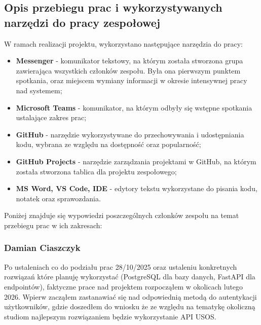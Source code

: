 \documentclass[12pt,a4paper]{article}
\begin{document}
\subsection{Opis przebiegu prac i wykorzystywanych narzędzi do pracy zespołowej}

W ramach realizacji projektu, wykorzystano następujące narzędzia do pracy:
\begin{itemize}
    \item \textbf{Messenger} - komunikator tekstowy, na którym została stworzona grupa zawierająca wszystkich członków zespołu. Była ona pierwszym punktem spotkania, oraz miejscem wymiany informacji w okresie intensywnej pracy nad systemem;
    \item \textbf{Microsoft Teams} - komunikator, na którym odbyły się wstępne spotkania ustalające zakres prac;
    \item \textbf{GitHub} - narzędzie wykorzystywane do przechowywania i udostępniania kodu, wybrana ze względu na dostępność oraz popularność;
    \item \textbf{GitHub Projects} - narzędzie zarządzania projektami w GitHub, na którym została stworzona tablica dla projektu zespołowego;
    \item \textbf{MS Word, VS Code, IDE} - edytory tekstu wykorzystane do pisania kodu, notatek oraz sprawozdania.
\end{itemize}

Poniżej znajduje się wypowiedzi poszczególnych członków zespołu na temat przebiegu prac w ich zakresach:

\subsubsection*{Damian Ciaszczyk}

Po ustaleniach co do podziału prac 28/10/2025 oraz ustaleniu konkretnych rozwiązań które planuję wykorzystać (PostgreSQL dla bazy danych, FastAPI dla endpointów), faktyczne prace nad projektem rozpocząłem w okolicach lutego 2026. Wpierw zacząłem zastanawiać się nad odpowiednią metodą do autentykacji użytkowników, gdzie doszedłem do wniosku że ze względu na tematykę okoliczną studiom najlepszym rozwiązaniem będzie wykorzystanie API USOS. 
\end{document}
